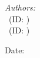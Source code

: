 \begin{titlepage}
\begin{flushleft} \large
\textit{Authors:}\\
\reportauthorOne~(ID: \cidOne)\\ %
\reportauthorTwo~(ID: \cidTwo) %
\end{flushleft}
\vspace{4cm}
\makeatletter
Date: \@date 

\vfill %



\makeatother


\end{titlepage}

